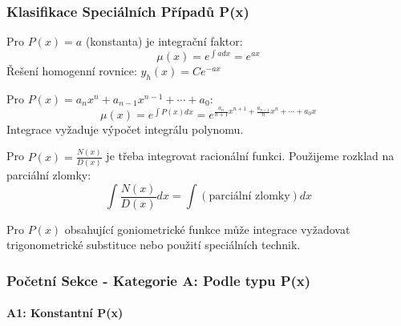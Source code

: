 \vspace{0.8\baselineskip}

\subsubsection{Klasifikace Speciálních Případů P(x)}
\label{subsubsec:klasifikace-px}

\begin{remark}[Konstantní P(x)]
Pro $P(x) = a$ (konstanta) je integrační faktor:
\[
\mu(x) = e^{\int a  dx} = e^{ax}
\]
Řešení homogenní rovnice: $y_h(x) = Ce^{-ax}$
\end{remark}

\vspace{0.6\baselineskip}

\begin{remark}[Polynomiální P(x)]
Pro $P(x) = a_nx^n + a_{n-1}x^{n-1} + \cdots + a_0$:
\[
\mu(x) = e^{\int P(x)dx} = e^{\frac{a_n}{n+1}x^{n+1} + \frac{a_{n-1}}{n}x^n + \cdots + a_0x}
\]
Integrace vyžaduje výpočet integrálu polynomu.
\end{remark}

\vspace{0.6\baselineskip}

\begin{remark}[Racionální P(x)]
Pro $P(x) = \frac{N(x)}{D(x)}$ je třeba integrovat racionální funkci. Použijeme rozklad na parciální zlomky:
\[
\int \frac{N(x)}{D(x)} dx = \int \left(\text{parciální zlomky}\right) dx
\]
\end{remark}

\vspace{0.6\baselineskip}

\begin{remark}[Goniometrické P(x)]
Pro $P(x)$ obsahující goniometrické funkce může integrace vyžadovat trigonometrické substituce nebo použití speciálních technik.
\end{remark}

\vspace{0.8\baselineskip}

\subsubsection{Početní Sekce - Kategorie A: Podle typu P(x)}
\label{subsubsec:pocetni-kategorie-a-px}

\paragraph*{A1: Konstantní P(x)}

